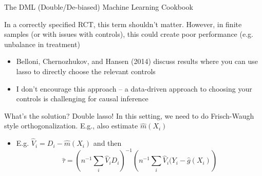\documentclass[notes,11pt, aspectratio=169]{beamer}
\newenvironment{wideitemize}{\itemize\addtolength{\itemsep}{10pt}}{\enditemize}
\begin{document}
\begin{frame}{The DML (Double/De-biased) Machine Learning Cookbook}
  \begin{wideitemize}
  \item In a correctly specified RCT, this term shouldn't
    matter. However, in finite samples (or with issues with controls),
    this could create poor performance (e.g. unbalance in treatment)
    \begin{itemize}
    \item Belloni, Chernozhukov, and Hansen (2014) discuss results
      where you can use lasso to directly choose the relevant controls
    \item I don't encourage this approach -- a data-driven approach to
      choosing your controls is challenging for causal inference
    \end{itemize}
  \item What's the solution? Double lasso! In this setting, we need to
    do Frisch-Waugh style orthogonalization. E.g., also estimate
    $\hat{m}(X_{i})$
    \begin{itemize}
    \item E.g. $\hat{V}_{i} = D_{i} - \hat{m}(X_{i})$  and then
  $$\hat{\tau} = \left(n^{-1}\sum_{i}\hat{V}_{i}D_{i}\right)^{-1}\left(n^{-1}\sum_{i}\hat{V}_{i}(Y_{i} - \hat{g}(X_{i})\right)$$      
    \end{itemize}
  \end{wideitemize}
\end{frame}
\end{document}
